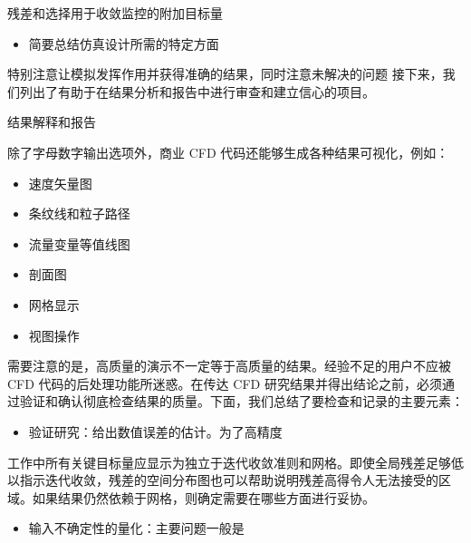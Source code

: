 \documentclass[11pt,a4paper,openany,fontset=none]{ctexbook}
\begin{document}
残差和选择用于收敛监控的附加目标量

\begin{itemize}

\item 简要总结仿真设计所需的特定方面

\end{itemize}

特别注意让模拟发挥作用并获得准确的结果，同时注意未解决的问题
接下来，我们列出了有助于在结果分析和报告中进行审查和建立信心的项目。

结果解释和报告

除了字母数字输出选项外，商业 CFD 代码还能够生成各种结果可视化，例如：

\begin{itemize}

\item 速度矢量图

\item 条纹线和粒子路径

\item 流量变量等值线图

\item 剖面图

\end{itemize}

\begin{itemize}

\item 网格显示

\item 视图操作

\end{itemize}

需要注意的是，高质量的演示不一定等于高质量的结果。经验不足的用户不应被 CFD 代码的后处理功能所迷惑。在传达 CFD 研究结果并得出结论之前，必须通过验证和确认彻底检查结果的质量。下面，我们总结了要检查和记录的主要元素：

\begin{itemize}

\item 验证研究：给出数值误差的估计。为了高精度

\end{itemize}

工作中所有关键目标量应显示为独立于迭代收敛准则和网格。即使全局残差足够低以指示迭代收敛，残差的空间分布图也可以帮助说明残差高得令人无法接受的区域。如果结果仍然依赖于网格，则确定需要在哪些方面进行妥协。

\begin{itemize}

\item 输入不确定性的量化：主要问题一般是

\end{itemize}
\end{document}
